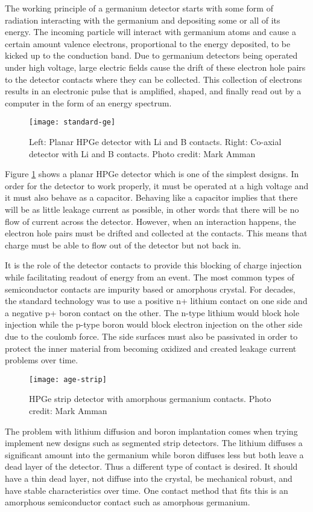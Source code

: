 The working principle of a germanium detector starts with some form of radiation interacting with the germanium and depositing some or all of its energy.
The incoming particle will interact with germanium atoms and cause a certain amount valence electrons, proportional to the energy deposited, to be kicked up to the conduction band.
Due to germanium detectors being operated under high voltage, large electric fields cause the drift of these electron hole pairs to the detector contacts where they can be collected.
This collection of electrons results in an electronic pulse that is amplified, shaped, and finally read out by a computer in the form of an energy spectrum.
\begin{figure}[htpb]
\centering
\texttt{[image: standard-ge]}
\caption{Left: Planar HPGe detector with Li and B contacts. Right: Co-axial detector with Li and B contacts. Photo credit: Mark Amman}
\label{fig:standard-ge}
\end{figure}
Figure \ref{fig:standard-ge} shows a planar HPGe detector which is one of the simplest designs.
In order for the detector to work properly, it must be operated at a high voltage and it must also behave as a capacitor.
Behaving like a capacitor implies that there will be as little leakage current as possible, in other words that there will be no flow of current across the detector.
However, when an interaction happens, the electron hole pairs must be drifted and collected at the contacts.
This means that charge must be able to flow out of the detector but not back in.

It is the role of the detector contacts to provide this blocking of charge injection while facilitating readout of energy from an event.
The most common types of semiconductor contacts are impurity based or amorphous crystal.
For decades, the standard technology was to use a positive n+ lithium contact on one side and a negative p+ boron contact on the other.
The n-type lithium would block hole injection while the p-type boron would block electron injection on the other side due to the coulomb force.
The side surfaces must also be passivated in order to protect the inner material from becoming oxidized and created leakage current problems over time.

\begin{figure}[htpb]
\centering
\texttt{[image: age-strip]}
\caption{HPGe strip detector with amorphous germanium contacts. Photo credit: Mark Amman}
\label{fig:age-strip}
\end{figure}
The problem with lithium diffusion and boron implantation comes when trying implement new designs such as segmented strip detectors.
The lithium diffuses a significant amount into the germanium while boron diffuses less but both leave a dead layer of the detector.
Thus a different type of contact is desired.
It should have a thin dead layer, not diffuse into the crystal, be mechanical robust, and have stable characteristics over time.
One contact method that fits this is an amorphous semiconductor contact such as amorphous germanium.

